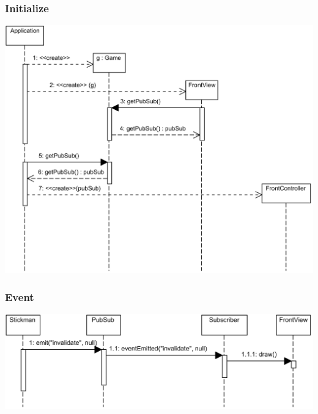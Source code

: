 		\subsubsection{Initialize}
		    \begin{center}
			    \includegraphics[scale=0.88]{resources/init.png}
		    \end{center}

		\subsubsection{Event}
		    \begin{center}
			    \includegraphics[scale=0.88]{resources/event.png}
		    \end{center}

